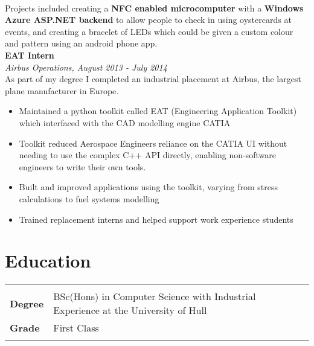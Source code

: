 \documentclass{article}
\begin{document}
\begin{flushleft}
\paragraph{}Projects included creating a \textbf{NFC enabled microcomputer} with a \textbf{Windows Azure ASP.NET backend} to allow people to check in using oystercards at events, and creating a bracelet of LEDs which could be given a custom colour and pattern using an android phone app. \\[10pt]

\textbf{EAT Intern}\\
\textit{Airbus Operations, August 2013 - July 2014}\\[5pt]
As part of my degree I completed an industrial placement at Airbus, the largest plane manufacturer in Europe. 

\begin{itemize}
\item Maintained a python toolkit called EAT (Engineering Application Toolkit) which interfaced with the CAD modelling engine CATIA
\item Toolkit reduced Aerospace Engineers reliance on the CATIA UI without needing to use the complex C++ API directly, enabling non-software engineers to write their own tools.
\item Built and improved applications using the toolkit, varying from stress calculations to fuel systems modelling	
\item Trained replacement interns and helped support work experience students
\end{itemize}

\section*{Education}
\begin{tabular}{@{}ll@{}}
    \multicolumn{2}{l}{}\\
    \textbf{Degree} &BSc(Hons) in Computer Science with Industrial Experience at the University of Hull  \\
    \textbf{Grade} &First Class   \\
    &\\
\end{tabular}


\end{flushleft}
\end{document}
